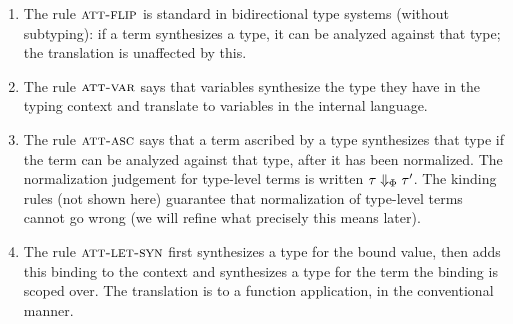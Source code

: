 \begin{enumerate}
\item The rule $\textsc{att-flip}$ is standard in bidirectional type systems (without subtyping): if a term synthesizes a type, it can be analyzed against that type; the translation is unaffected by this.
\item The rule $\textsc{att-var}$ says that variables synthesize the type they have in the typing context and translate to variables in the internal language.
\item The rule $\textsc{att-asc}$ says that a term ascribed by a type synthesizes that type if the term can be  analyzed against that type, after it has been normalized. The normalization judgement for type-level terms is written $\tau \Downarrow_\Phi \tau'$. The kinding rules (not shown here) guarantee that normalization of type-level terms cannot go wrong (we will refine what precisely this means later).
\item The rule $\textsc{att-let-syn}$ first synthesizes a type for the bound value, then adds this binding to the context and synthesizes a type for the term the binding is scoped over. The translation is to a function application, in the conventional manner. 


\end{enumerate}
